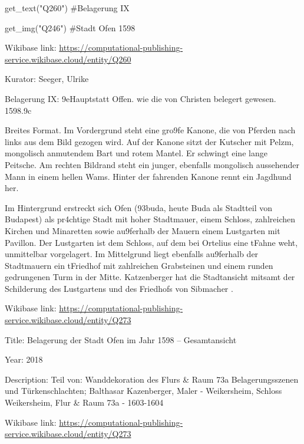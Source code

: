 \documentclass[
  a4paper,
  portrait]{book}
\newenvironment{Shaded}{\begin{snugshade}}{\end{snugshade}}
\newcommand{\CommentTok}[1]{\textcolor[rgb]{0.37,0.37,0.37}{#1}}
\newcommand{\NormalTok}[1]{\textcolor[rgb]{0.00,0.23,0.31}{#1}}
\newcommand{\StringTok}[1]{\textcolor[rgb]{0.13,0.47,0.30}{#1}}
\begin{document}
\begin{Shaded}
\begin{Highlighting}[]
\NormalTok{get\_text(}\StringTok{"Q260"}\NormalTok{)}
\CommentTok{\#Belagerung IX}

\NormalTok{get\_img(}\StringTok{"Q246"}\NormalTok{)}
\CommentTok{\#Stadt Ofen 1598}
\end{Highlighting}
\end{Shaded}

Wikibase link:
\url{https://computational-publishing-service.wikibase.cloud/entity/Q260}

Kurator: Seeger, Ulrike

Belagerung IX: \x9eHauptstatt Offen. wie die von Christen
belegert gewesen. 1598.\x9c

Breites Format. Im Vordergrund steht eine gro\x9fe Kanone, die von
Pferden nach links aus dem Bild gezogen wird. Auf der Kanone sitzt der
Kutscher mit Pelzm\xbctze, mongolisch anmutendem Bart und rotem
Mantel. Er schwingt eine lange Peitsche. Am rechten Bildrand steht ein
junger, ebenfalls mongolisch aussehender Mann in einem hellen Wams.
Hinter der fahrenden Kanone rennt ein Jagdhund her.

Im Hintergrund erstreckt sich Ofen (\x93buda, heute Buda als
Stadtteil von Budapest) als pr\xa4chtige Stadt mit hoher Stadtmauer,
einem Schloss, zahlreichen Kirchen und Minaretten sowie au\x9ferhalb
der Mauern einem Lustgarten mit Pavillon. Der Lustgarten ist dem
Schloss, auf dem bei Ortelius eine t\xbcrkische Fahne weht,
unmittelbar vorgelagert. Im Mittelgrund liegt ebenfalls au\x9ferhalb
der Stadtmauern ein t\xbcrkischer Friedhof mit zahlreichen
Grabsteinen und einem runden gedrungenen Turm in der Mitte. Katzenberger
hat die Stadtansicht mitsamt der Schilderung des Lustgartens und des
Friedhofs von Sibmacher \xbcbernommen.

Wikibase link:
\url{https://computational-publishing-service.wikibase.cloud/entity/Q273}

Title: Belagerung der Stadt Ofen im Jahr 1598 -- Gesamtansicht

Year: 2018

Description: Teil von: Wanddekoration des Flurs \& Raum 73a
Belagerungsszenen und Türkenschlachten; Balthasar Kazenberger, Maler -
Weikersheim, Schloss Weikersheim, Flur \& Raum 73a - 1603-1604

Wikibase link:
\url{https://computational-publishing-service.wikibase.cloud/entity/Q273}
\end{document}
